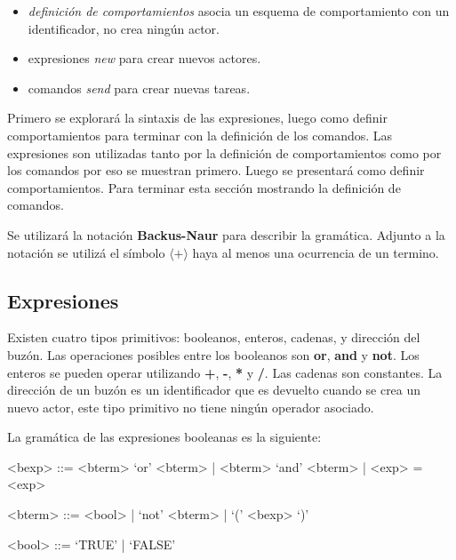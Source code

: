 \begin{itemize}
 \item \textit{definición de comportamientos} asocia un esquema de comportamiento con un identificador, no crea ningún actor.
 \item expresiones \textit{new} para crear nuevos actores.
 \item comandos \textit{send} para crear nuevas tareas.
\end{itemize}

Primero se explorará la sintaxis de las expresiones, luego como definir comportamientos para terminar con la definición de los comandos. Las expresiones son utilizadas tanto por la definición de comportamientos como por los comandos por eso se muestran primero. Luego se presentará como definir comportamientos. Para terminar esta sección mostrando la definición de comandos.


Se utilizará la notación \textbf{Backus-Naur}\cite{McCracken:2003:BF:1074100.1074155} para describir la gramática. Adjunto a la notación se utilizá el símbolo $\langle \textbf{+} \rangle$ haya al menos una ocurrencia de un termino.

\subsection{Expresiones}\label{actores:exp}
Existen cuatro tipos primitivos: booleanos, enteros, cadenas, y dirección del buzón. Las operaciones posibles entre los booleanos son \textbf{or}, \textbf{and} y \textbf{not}. Los enteros se pueden operar utilizando \textbf{+}, \textbf{-}, \textbf{*} y \textbf{/}. Las cadenas son constantes. La dirección de un buzón es un identificador que es devuelto cuando se crea un nuevo actor, este tipo primitivo no tiene ningún operador asociado.

La gramática de las expresiones booleanas es la siguiente:

\begin{grammar}

<bexp> ::= <bterm> `or' <bterm> | <bterm> `and' <bterm> | <exp> = <exp>
  
<bterm> ::= <bool> | `not' <bterm> | `(' <bexp> `)' 

<bool> ::= `TRUE' | `FALSE'

\end{grammar}

